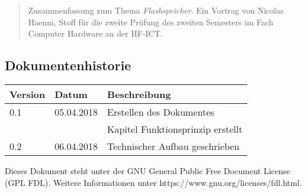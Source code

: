 \maketitle
\begin{abstract}
    Zusammenfassung zum Thema \emph{Flashspeicher}. Ein Vortrag von Nicolas Haenni, Stoff für die zweite Prüfung des zweiten Semesters im Fach Computer Hardware an der HF-ICT.
\end{abstract}

\subsection*{Dokumentenhistorie}
\begin{center}
    \begin{tabularx}{.9\textwidth}{llX}
        \toprule
        \textbf{Version} & \textbf{Datum} & \textbf{Beschreibung} \\
        \midrule
        0.1 & 05.04.2018 & Erstellen des Dokumentes \\
            &			 & Kapitel Funktionsprinzip erstellt \\
        0.2 & 06.04.2018 & Technischer Aufbau geschrieben \\
        \bottomrule
    \end{tabularx}
\end{center}

\vfill

\footnotesize{Dieses Dokument steht unter der GNU General Public Free Document License (GPL FDL). Weitere Informationen unter https://www.gnu.org/licenses/fdl.html.}
\clearpage